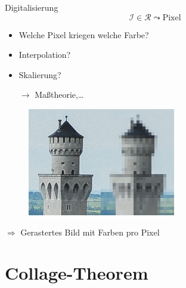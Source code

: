 \documentclass[10pt]{beamer}
\begin{document}
\begin{frame}{Digitalisierung}
  \begin{equation*}
    \mathcal{I} \in \mathcal{R} \leadsto \text{Pixel}
  \end{equation*}

  \begin{minipage}{.45\textwidth}
    \begin{itemize}
      \item Welche Pixel kriegen welche Farbe?
      \item Interpolation?
      \item Skalierung?
      \item[\( \to \)] Maßtheorie,\dots
    \end{itemize}
  \end{minipage}
  \hfill
  \begin{minipage}{.45\textwidth}
    \begin{figure}
      \includegraphics[width=\textwidth]{neuschwanstein-rasterization}
    \end{figure}
  \end{minipage}

  \( \Rightarrow \) Gerastertes Bild mit Farben pro Pixel
\end{frame}

\section{Collage-Theorem}
\end{document}
